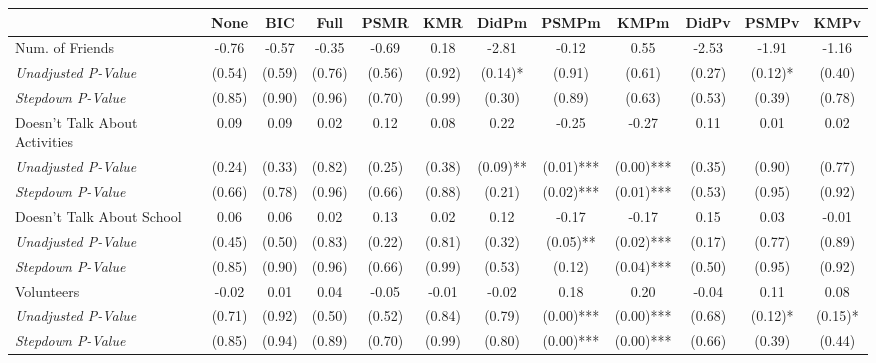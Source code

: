 \begin{tabular}{l c c c c c c c c c c c}
\toprule
 & None & BIC & Full & PSMR & KMR & DidPm & PSMPm & KMPm & DidPv & PSMPv & KMPv \\
\midrule
Num. of Friends & -0.76 & -0.57 & -0.35 & -0.69 & 0.18 & -2.81 & -0.12 & 0.55 & -2.53 & -1.91 & -1.16 \\
\quad \textit{Unadjusted P-Value} & (0.54) & (0.59) & (0.76) & (0.56) & (0.92) & (0.14)* & (0.91) & (0.61) & (0.27) & (0.12)* & (0.40) \\
\quad \textit{Stepdown P-Value} & (0.85) & (0.90) & (0.96) & (0.70) & (0.99) & (0.30) & (0.89) & (0.63) & (0.53) & (0.39) & (0.78) \\
Doesn't Talk About Activities & 0.09 & 0.09 & 0.02 & 0.12 & 0.08 & 0.22 & -0.25 & -0.27 & 0.11 & 0.01 & 0.02 \\
\quad \textit{Unadjusted P-Value} & (0.24) & (0.33) & (0.82) & (0.25) & (0.38) & (0.09)** & (0.01)*** & (0.00)*** & (0.35) & (0.90) & (0.77) \\
\quad \textit{Stepdown P-Value} & (0.66) & (0.78) & (0.96) & (0.66) & (0.88) & (0.21) & (0.02)*** & (0.01)*** & (0.53) & (0.95) & (0.92) \\
Doesn't Talk About School & 0.06 & 0.06 & 0.02 & 0.13 & 0.02 & 0.12 & -0.17 & -0.17 & 0.15 & 0.03 & -0.01 \\
\quad \textit{Unadjusted P-Value} & (0.45) & (0.50) & (0.83) & (0.22) & (0.81) & (0.32) & (0.05)** & (0.02)*** & (0.17) & (0.77) & (0.89) \\
\quad \textit{Stepdown P-Value} & (0.85) & (0.90) & (0.96) & (0.66) & (0.99) & (0.53) & (0.12) & (0.04)*** & (0.50) & (0.95) & (0.92) \\
Volunteers & -0.02 & 0.01 & 0.04 & -0.05 & -0.01 & -0.02 & 0.18 & 0.20 & -0.04 & 0.11 & 0.08 \\
\quad \textit{Unadjusted P-Value} & (0.71) & (0.92) & (0.50) & (0.52) & (0.84) & (0.79) & (0.00)*** & (0.00)*** & (0.68) & (0.12)* & (0.15)* \\
\quad \textit{Stepdown P-Value} & (0.85) & (0.94) & (0.89) & (0.70) & (0.99) & (0.80) & (0.00)*** & (0.00)*** & (0.66) & (0.39) & (0.44) \\
\bottomrule
\end{tabular}
